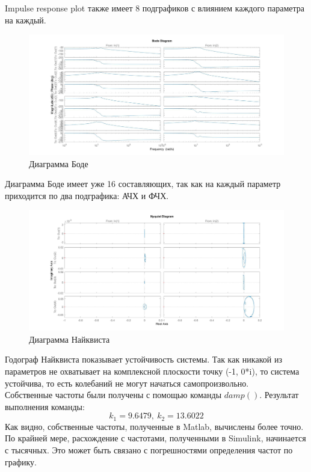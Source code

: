 \documentclass{article}
\begin{document}
	Impulse response plot также имеет 8 подграфиков с влиянием каждого параметра на каждый.
	\begin{figure}[H]
		\centering
		\includegraphics[width=1.2\linewidth]{mbode}
		\caption{Диаграмма Боде}
		\label{fig:mbode}
	\end{figure}
	Диаграмма Боде имеет уже 16 составляющих, так как на каждый параметр приходится по два подграфика: АЧХ и ФЧХ.
	\begin{figure}[H]
		\centering
		\includegraphics[width=1.2\linewidth]{nyquist}
		\caption{Диаграмма Найквиста}
		\label{fig:nyquist}
	\end{figure}
	Годограф Найквиста показывает устойчивость системы. Так как никакой из параметров не охватывает на комплексной плоскости точку (-1, 0*i), то система устойчива, то есть колебаний не могут начаться самопроизвольно.\\
	Собственные частоты были получены с помощью команды $damp()$. Результат выполнения команды:
	$$k_1 = 9.6479,\ k_2 = 13.6022$$
	Как видно, собственные частоты, полученные в Matlab, вычислены более точно. По крайней мере, расхождение с частотами, полученными в Simulink, начинается с тысячных. Это может быть связано с погрешностями определения частот по графику.
\end{document}

